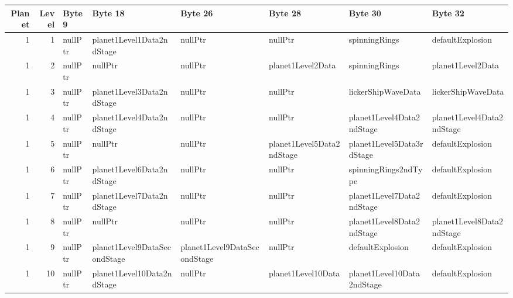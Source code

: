    \begin{tabular}{rrllllll}
      \hline
      Planet &   Level & Byte 9                   & Byte 18                      & Byte 26                      & Byte 28                   & Byte 30                    & Byte 32                    \\
      \hline
      1 &       1 & nullPtr                  & planet1Level1Data2ndStage    & nullPtr                      & nullPtr                   & spinningRings              & defaultExplosion           \\
      1 &       2 & nullPtr                  & nullPtr                      & nullPtr                      & planet1Level2Data         & spinningRings              & planet1Level2Data          \\
      1 &       3 & nullPtr                  & planet1Level3Data2ndStage    & nullPtr                      & nullPtr                   & lickerShipWaveData         & lickerShipWaveData         \\
      1 &       4 & nullPtr                  & planet1Level4Data2ndStage    & nullPtr                      & nullPtr                   & planet1Level4Data2ndStage  & planet1Level4Data2ndStage  \\
      1 &       5 & nullPtr                  & nullPtr                      & nullPtr                      & planet1Level5Data2ndStage & planet1Level5Data3rdStage  & defaultExplosion           \\
      1 &       6 & nullPtr                  & planet1Level6Data2ndStage    & nullPtr                      & nullPtr                   & spinningRings2ndType       & defaultExplosion           \\
      1 &       7 & nullPtr                  & planet1Level7Data2ndStage    & nullPtr                      & nullPtr                   & planet1Level7Data2ndStage  & defaultExplosion           \\
      1 &       8 & nullPtr                  & nullPtr                      & nullPtr                      & nullPtr                   & planet1Level8Data2ndStage  & planet1Level8Data2ndStage  \\
      1 &       9 & nullPtr                  & planet1Level9DataSecondStage & planet1Level9DataSecondStage & nullPtr                   & defaultExplosion           & defaultExplosion           \\
      1 &      10 & nullPtr                  & planet1Level10Data2ndStage   & nullPtr                      & planet1Level10Data        & planet1Level10Data2ndStage & defaultExplosion           \\

\end{tabular}

